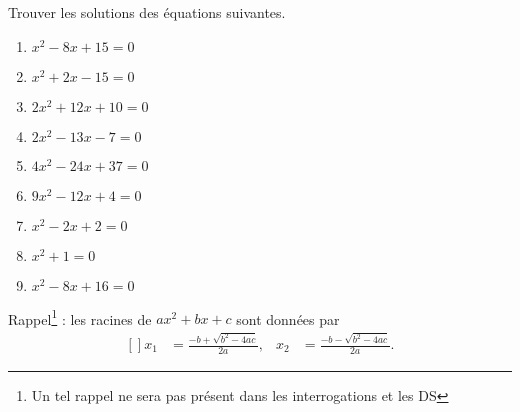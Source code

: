 
\begin{exercice}\label{exoPremiere-0069}

    Trouver les solutions des équations suivantes.
    \begin{multicols}{3}
        \begin{enumerate}
            \item
                \( x^2-8x+15=0\)
            \item
                \( x^2+2x-15=0\)
            \item
                \( 2x^2+12x+10=0\)
            \item
                \( 2x^2-13x-7=0\)
            \item
                \( 4x^2-24x+37=0\)
            \item
                \( 9x^2-12x+4=0\)
            \item
                \( x^2-2x+2=0\)
            \item
                \( x^2+1=0\)
            \item
                \( x^2-8x+16=0\)
        \end{enumerate}
    \end{multicols}

    Rappel\footnote{Un tel rappel ne sera pas présent dans les interrogations et les DS} : les racines de \( ax^2+bx+c\) sont données par
    \begin{equation}
        \begin{aligned}[]
            x_1&=\frac{ -b+\sqrt{b^2-4ac} }{ 2a },&x_2&=\frac{ -b-\sqrt{b^2-4ac} }{ 2a }.
        \end{aligned}
    \end{equation}

\end{exercice}
